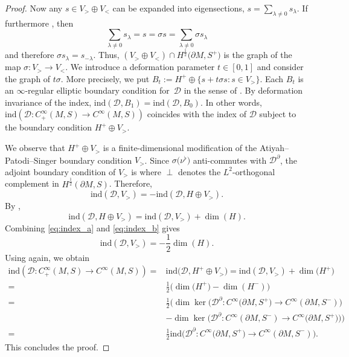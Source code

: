 \begin{proof}
Now any $s\in V_>\oplus V_<$ can be expanded into eigensections, $s=\sum_{\lambda\neq0}s_\lambda$.
If furthermore , then
\[
\sum_{\lambda\neq0}s_\lambda
=
s
=
\sigma s
=
\sum_{\lambda\neq0}\sigma s_\lambda
\]
and therefore $
\sigma s_\lambda = s_{-\lambda}$. Thus, $(V_>\oplus V_<) \cap H^{\frac{1}{2}}\big(\partial M,S^+\big)$ is the graph of the map $\sigma\colon V_> \to V_<$.
We introduce a deformation parameter $t\in [0,1]$ and consider the graph of $t\sigma$.
More precisely, we put $B_t := H^+ \oplus \{s+t\sigma s \colon s \in V_>\}$.
Each $B_t$ is an $\infty$-regular elliptic boundary condition for~$\mathcal{D}$ in the sense of \cite{Baer-Ballmann}.
By deformation invariance of the index, $\mathrm{ind}(\mathcal{D},B_1) = \mathrm{ind}(\mathcal{D},B_0)$. In other words, $\mathrm{ind}(\mathcal{D}\colon C^\infty_+(M,S)\to C^\infty(M,S))$ coincides with the index of $\mathcal{D}$ subject to the boundary condition $H^+\oplus V_>$.

We observe that $H^+\oplus V_>$ is a finite-dimensional modification of the Atiyah--Patodi--Singer boundary condition $V_>$.
Since $\sigma\big(\nu^\flat\big)$ anti-commutes with $\mathcal{D}^\partial$, the adjoint boundary condition of $V_>$ is  where $\perp$ denotes the $L^2$-orthogonal complement in $H^{\frac{1}{2}}(\partial M,S)$. Therefore,
\begin{equation} \label{eq:index_a}
\mathrm{ind}(\mathcal{D},V_>) = -\mathrm{ind}(\mathcal{D},H\oplus V_>).
\end{equation}
By \cite[Corollary~8.8]{Baer-Ballmann},
\begin{equation} \label{eq:index_b}
\mathrm{ind}(\mathcal{D},H\oplus V_>) = \mathrm{ind}(\mathcal{D},V_>)+\dim(H).
\end{equation}
Combining \eqref{eq:index_a} and \eqref{eq:index_b} gives
\[
\mathrm{ind}(\mathcal{D},V_>)
=
-\frac{1}{2} \dim(H).
\]
Using \cite[Corollary~8.8]{Baer-Ballmann} again, we obtain
\begin{align*}
\mathrm{ind}(\mathcal{D}\colon C^\infty_+(M,S)\to C^\infty(M,S))
={}&
\mathrm{ind}\big(\mathcal{D},H^+\oplus V_>\big) =
\mathrm{ind}(\mathcal{D},V_>)+\dim\big(H^+\big) \\
={}&
\frac{1}{2} \big(\dim\big(H^+\big)-\dim(H^-)\big) \\
={}&
\frac{1}{2} \big(\dim\ker\big(\mathcal{D}^\partial\colon C^\infty\big(\partial M,S^+\big)\to C^\infty(\partial M,S^-)\big) \\
& -\dim\ker\big(\mathcal{D}^\partial\colon C^\infty(\partial M,S^-)\to C^\infty\big(\partial M,S^+\big)\big)\big) \\
={}&
\frac{1}{2} \mathrm{ind}\big(\mathcal{D}^\partial\colon C^\infty\big(\partial M,S^+\big)\to C^\infty(\partial M,S^-)\big) .
\end{align*}
This concludes the proof.
\end{proof}

